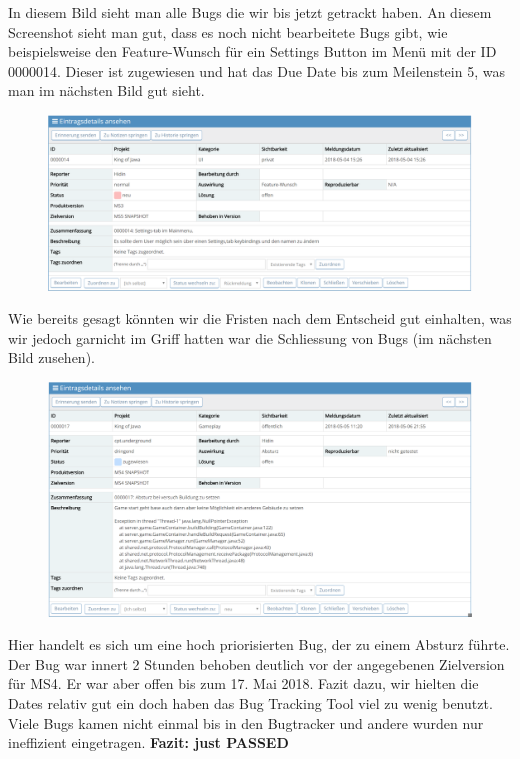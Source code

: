 \documentclass[]{scrartcl}
\newcommand{\n}{\newline}
\begin{document}
In diesem Bild sieht man alle Bugs die wir bis jetzt getrackt haben. An diesem Screenshot sieht man gut, dass es noch nicht bearbeitete Bugs gibt, wie beispielsweise den Feature-Wunsch für ein Settings Button im Menü mit der ID 0000014. Dieser ist zugewiesen und hat das Due Date bis zum Meilenstein 5, was man im nächsten Bild gut sieht.
\begin{figure}[H]
	\includegraphics[width=\linewidth]{bugs/bug.png}
\end{figure}
Wie bereits gesagt könnten wir die Fristen nach dem Entscheid gut einhalten, was wir jedoch garnicht im Griff hatten war die Schliessung von Bugs (im nächsten Bild zusehen).
\begin{figure}[H]
	\includegraphics[width=\linewidth]{bugs/bug1.png}
\end{figure}
Hier handelt es sich um eine hoch priorisierten Bug, der zu einem Absturz führte. Der Bug war innert 2 Stunden behoben deutlich vor der angegebenen Zielversion für MS4. Er war aber offen bis zum 17. Mai 2018. Fazit dazu, wir hielten die Dates relativ gut ein doch haben das Bug Tracking Tool viel zu wenig benutzt. Viele Bugs kamen nicht einmal bis in den Bugtracker und andere wurden nur ineffizient eingetragen.\n
\textbf{Fazit: just PASSED}
\end{document}
